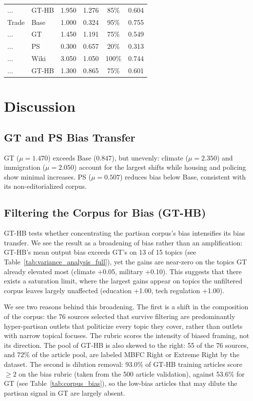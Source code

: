\documentclass[11pt]{article}
\begin{document}
\begin{table}[htbp]
\begin{tabular}{llcccc}
    ...              & GT-HB & 1.950 & 1.276 & 85\%  & 0.604 \\
    \addlinespace
    Trade            & Base  & 1.000 & 0.324 & 95\%  & 0.755 \\
    ...              & GT    & 1.450 & 1.191 & 75\%  & 0.549 \\
    ...              & PS    & 0.300 & 0.657 & 20\%  & 0.313 \\
    ...              & Wiki  & 3.050 & 1.050 & 100\% & 0.744 \\
    ...              & GT-HB & 1.300 & 0.865 & 75\%  & 0.601 \\
    \bottomrule
  \end{tabular}
\end{table}


\section{Discussion}

\subsection{GT and PS Bias Transfer}

GT ($\mu=1.470$) exceeds Base ($0.847$), but unevenly: climate ($\mu=2.350$) and immigration ($\mu=2.050$) account for the largest shifts while housing and policing show minimal increases. PS ($\mu=0.507$) reduces bias below Base, consistent with its non-editorialized corpus.

\subsection{Filtering the Corpus for Bias (GT-HB)}

GT-HB tests whether concentrating the partisan corpus's bias intensifies its bias transfer.
We see the result as a broadening of bias rather than an amplification: GT-HB's mean output bias exceeds GT's on 13 of 15 topics (see Table~\ref{tab:variance_analysis_full}), yet the gains are near-zero on the topics GT already elevated most (climate +0.05, military +0.10).  
This suggests that there exists a saturation limit, where the largest gains appear on topics the unfiltered corpus leaves largely unaffected (education +1.00, tech regulation +1.00).

We see two reasons behind this broadening.
The first is a shift in the composition of the corpus: the 76 sources selected that survive filtering are predominantly hyper-partisan outlets that politicize every topic they cover, rather than outlets with narrow topical focuses.
The rubric scores the intensity of biased framing, not its direction.
The pool of GT-HB is also skewed to the right: 55 of the 76 sources, and $72\%$ of the article pool, are labeled MBFC Right or Extreme Right by the dataset.
The second is dilution removal: 93.0\% of GT-HB training articles score $\geq 2$ on the bias rubric (taken from the 500 article validation), against 53.6\% for GT (see Table~\ref{tab:corpus_bias}), so the low-bias articles that may dilute the partisan signal in GT are largely absent.
\end{document}
